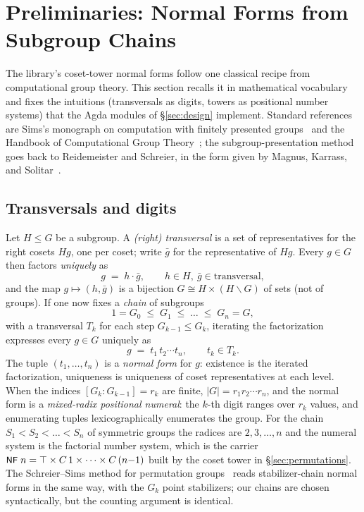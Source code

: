 \section{Preliminaries: Normal Forms from Subgroup Chains}\label{sec:preliminaries}

The library's coset-tower normal forms follow one classical recipe from
computational group theory.  This section recalls it in mathematical
vocabulary and fixes the intuitions (transversals as digits, towers as
positional number systems) that the Agda modules of
\S\ref{sec:design} implement.  Standard references are Sims's monograph on
computation with finitely presented groups~\cite{sims1994computation} and
the Handbook of Computational Group Theory~\cite{holt2005handbook}; the
subgroup-presentation method goes back to Reidemeister and Schreier, in the
form given by Magnus, Karrass, and Solitar~\cite{magnus2004combinatorial}.

\subsection{Transversals and digits}

Let $H \le G$ be a subgroup.  A \emph{(right) transversal} is a set of
representatives for the right cosets $Hg$, one per coset; write $\bar g$
for the representative of $Hg$.  Every $g \in G$ then factors
\emph{uniquely} as
\[
  g \;=\; h \cdot \bar g, \qquad h \in H,\ \bar g \in \text{transversal},
\]
and the map $g \mapsto (h, \bar g)$ is a bijection
$G \cong H \times (H\backslash G)$ of sets (not of groups).  If one now
fixes a \emph{chain} of subgroups
\[
  1 = G_0 \;\le\; G_1 \;\le\; \dots \;\le\; G_n = G ,
\]
with a transversal $T_k$ for each step $G_{k-1} \le G_k$, iterating the
factorization expresses every $g \in G$ uniquely as
\[
  g \;=\; t_1 \, t_2 \cdots t_n , \qquad t_k \in T_k .
\]
The tuple $(t_1,\dots,t_n)$ is a \emph{normal form} for $g$: existence is
the iterated factorization, uniqueness is uniqueness of coset
representatives at each level.  When the indices $[G_k : G_{k-1}] = r_k$
are finite, $|G| = r_1 r_2 \cdots r_n$, and the normal form is a
\emph{mixed-radix positional numeral}: the $k$-th digit ranges over $r_k$
values, and enumerating tuples lexicographically enumerates the group.  For
the chain $S_1 < S_2 < \dots < S_n$ of symmetric groups the radices are
$2, 3, \dots, n$ and the numeral system is the factorial number system,
which is the carrier $\mbox{\textsf{\small NF}}\;n = \top \times C\,1 \times \dots
\times C\,(n{-}1)$ built by the coset tower in \S\ref{sec:permutations}.
The Schreier--Sims method for permutation
groups~\cite{holt2005handbook} reads stabilizer-chain normal forms in the
same way, with the $G_k$ point stabilizers; our chains are chosen
syntactically, but the counting argument is identical.

